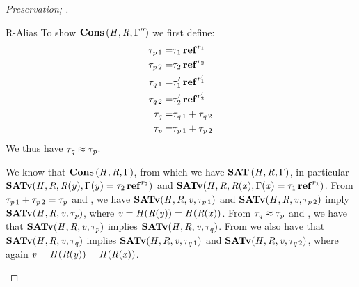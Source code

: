\begin{proof}[Preservation; ]
\begin{rneqncase}{R-Alias}
    To show $\mathbf{Cons} \, (  \mathit{H}  ,  \mathit{R}  ,  \Gamma''  )$ we first define:
    \begin{align*}
      \tau_{\mathit{p}\,{\mathrm{1}}} = &  \tau_{{\mathrm{1}}}  \operatorname{\mathbf{ref}}^{ r_{{\mathrm{1}}} }  \\
      \tau_{\mathit{p}\,{\mathrm{2}}} = &  \tau_{{\mathrm{2}}}  \operatorname{\mathbf{ref}}^{ r_{{\mathrm{2}}} }  \\
      \tau_{\mathit{q}\,{\mathrm{1}}} = &  \tau'_{{\mathrm{1}}}  \operatorname{\mathbf{ref}}^{ r'_{{\mathrm{1}}} }  \\
      \tau_{\mathit{q}\,{\mathrm{2}}} = &  \tau'_{{\mathrm{2}}}  \operatorname{\mathbf{ref}}^{ r'_{{\mathrm{2}}} }  \\
      \tau_{\mathit{q}} = & \tau_{\mathit{q}\,{\mathrm{1}}}  +  \tau_{\mathit{q}\,{\mathrm{2}}} \\
      \tau_{\mathit{p}} = & \tau_{\mathit{p}\,{\mathrm{1}}}  +  \tau_{\mathit{p}\,{\mathrm{2}}}
    \end{align*}
    We thus have $\tau_{\mathit{q}}  \approx  \tau_{\mathit{p}}$.
    
    We know that $\mathbf{Cons} \, (  \mathit{H}  ,  \mathit{R}  ,  \Gamma  )$, from which we have $\mathbf{SAT} \, (  \mathit{H}  ,  \mathit{R}  ,  \Gamma  )$, in particular
    $ \mathbf{SATv} ( \mathit{H} , \mathit{R} , \mathit{R}  (  \mathit{y}  ) ,  \Gamma  (  \mathit{y}  )  =  \tau_{{\mathrm{2}}}  \operatorname{\mathbf{ref}}^{ r_{{\mathrm{2}}} }  ) $ and $ \mathbf{SATv} ( \mathit{H} , \mathit{R} , \mathit{R}  (  \mathit{x}  ) ,  \Gamma  (  \mathit{x}  )  =  \tau_{{\mathrm{1}}}  \operatorname{\mathbf{ref}}^{ r_{{\mathrm{1}}} }  ) $.
    From $\tau_{\mathit{p}\,{\mathrm{1}}}  +  \tau_{\mathit{p}\,{\mathrm{2}}}  =  \tau_{\mathit{p}}$ and , we have
    $ \mathbf{SATv} ( \mathit{H} , \mathit{R} , \mathit{v} , \tau_{\mathit{p}\,{\mathrm{1}}} ) $ and $ \mathbf{SATv} ( \mathit{H} , \mathit{R} , \mathit{v} , \tau_{\mathit{p}\,{\mathrm{2}}} ) $ imply $ \mathbf{SATv} ( \mathit{H} , \mathit{R} , \mathit{v} , \tau_{\mathit{p}} ) $, where $\mathit{v}  =  \mathit{H}  (  \mathit{R}  (  \mathit{y}  )  )  =  \mathit{H}  (  \mathit{R}  (  \mathit{x}  )  )$.
    From $\tau_{\mathit{q}}  \approx  \tau_{\mathit{p}}$ and , we have that $ \mathbf{SATv} ( \mathit{H} , \mathit{R} , \mathit{v} , \tau_{\mathit{p}} ) $ implies $ \mathbf{SATv} ( \mathit{H} , \mathit{R} , \mathit{v} , \tau_{\mathit{q}} ) $.
    From  we also have that $ \mathbf{SATv} ( \mathit{H} , \mathit{R} , \mathit{v} , \tau_{\mathit{q}} ) $ implies $ \mathbf{SATv} ( \mathit{H} , \mathit{R} , \mathit{v} , \tau_{\mathit{q}\,{\mathrm{1}}} ) $ and $ \mathbf{SATv} ( \mathit{H} , \mathit{R} , \mathit{v} , \tau_{\mathit{q}\,{\mathrm{2}}} ) $, where
    again $\mathit{v}  =  \mathit{H}  (  \mathit{R}  (  \mathit{y}  )  )  =  \mathit{H}  (  \mathit{R}  (  \mathit{x}  )  )$.


\end{rneqncase}
\end{proof}
